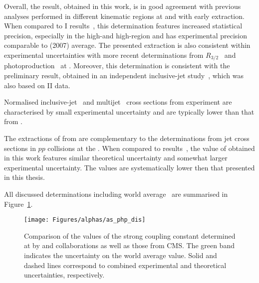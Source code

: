 Overall, the result, obtained in this work, is in good agreement with previous analyses performed in different kinematic regions at \zeus and with early \hone extraction. When compared to \hera I results~\cite{pl:b649:12,Aktas:2007aa,pl:b560:7}, this determination features increased statistical precision, especially in the high-\etjetb and high-\qsq region and has experimental precision comparable to \hera (2007) average. The presented extraction is also consistent within experimental uncertainties with more recent determinations from $R_{3/2}$~\cite{thesis:behr:2010} and photoproduction~\cite{np:b864:1} at \zeus. Moreover, this \asz determination is consistent with the preliminary result, obtained in an independent inclusive-jet study~\cite{upub:zp10002}, which was also based on \hera II data. %

Normalised inclusive-jet~\cite{epj:c65:363} and multijet~\cite{epj:c75:65} cross sections from \hone experiment are characterised by small experimental uncertainty and are typically lower than that from \zeus. %

The extractions of \asz from \hera are complementary to the determinations from jet cross sections in $pp$ collisions at the \lhc. When compared to \cms results~\cite{Chatrchyan:2012bja,Chatrchyan:2013txa,CMS:2014mna}, the value of \asz obtained in this work features similar theoretical uncertainty and somewhat larger experimental uncertainty. The \cms values are systematically lower then that presented in this thesis.

All discussed determinations including world average~\cite{PDG:2014} are summarised in Figure~\ref{fig:as_php_dis}.
\begin{figure}[htpb]
	\centering
		\texttt{[image: Figures/alphas/as\_php\_dis]}
	\caption{Comparison of the values of the strong coupling constant determined at \hera by \hone and \zeus collaborations as well as those from CMS. The green band indicates the uncertainty on the world average \as value. Solid and dashed lines correspond to combined experimental and theoretical uncertainties, respectively.}
	\label{fig:as_php_dis}
\end{figure}
